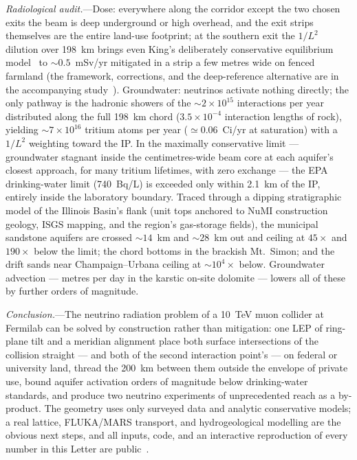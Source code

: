 \documentclass[aps,prl,reprint,superscriptaddress,nofootinbib]{revtex4-2}
\begin{document}
\emph{Radiological audit.}---Dose: everywhere along the corridor except
the two chosen exits the beam is deep underground or high overhead, and
the exit strips themselves are the entire land-use footprint; at the
southern exit the $1/L^{2}$ dilution over 198~km brings even King's
deliberately conservative equilibrium model~\cite{King} to
${\sim}0.5$~mSv/yr mitigated in a strip a few metres wide on fenced
farmland (the framework, corrections, and the deep-reference alternative
are in the accompanying study~\cite{site}). Groundwater: neutrinos
activate nothing directly; the only pathway is the hadronic showers of
the ${\sim}2\times10^{15}$ interactions per year distributed along the
full 198~km chord ($3.5\times10^{-4}$ interaction lengths of rock),
yielding ${\sim}7\times10^{16}$ tritium atoms per year
(${\simeq}0.06$~Ci/yr at saturation) with a $1/L^{2}$ weighting toward
the IP. In the maximally conservative limit --- groundwater stagnant
inside the centimetres-wide beam core at each aquifer's closest approach,
for many tritium lifetimes, with zero exchange --- the EPA drinking-water
limit (740~Bq/L) is exceeded only within 2.1~km of the IP, entirely
inside the laboratory boundary. Traced through a dipping stratigraphic
model of the Illinois Basin's flank (unit tops anchored to NuMI
construction geology, ISGS mapping, and the region's gas-storage fields),
the municipal sandstone aquifers are crossed ${\sim}14$~km and
${\sim}28$~km out and ceiling at $45\times$ and $190\times$ below the
limit; the chord bottoms in the brackish Mt.~Simon; and the drift sands
near Champaign--Urbana ceiling at ${\sim}10^{4}\times$ below.
Groundwater advection --- metres per day in the karstic on-site
dolomite --- lowers all of these by further orders of magnitude.

\emph{Conclusion.}---The neutrino radiation problem of a 10~TeV muon
collider at Fermilab can be solved by construction rather than
mitigation: one LEP of ring-plane tilt and a meridian alignment place
both surface intersections of the collision straight --- and both of the
second interaction point's --- on federal or university land, thread the
200~km between them outside the envelope of private use, bound aquifer
activation orders of magnitude below drinking-water standards, and
produce two neutrino experiments of unprecedented reach as a by-product.
The geometry uses only surveyed data and analytic conservative models; a
real lattice, FLUKA/MARS transport, and hydrogeological modelling are the
obvious next steps, and all inputs, code, and an interactive
reproduction of every number in this Letter are public~\cite{site}.
\end{document}
